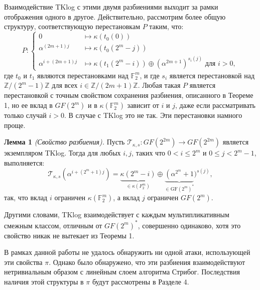 Взаимодействие TKlog с этими двумя разбиениями выходит за рамки отображения одного в другое. Действительно, рассмотрим более общую структуру, соответствующую перестановкам \( P \) таким, что:
\begin{equation}
  P :
  \begin{cases}
    0 & \mapsto \kappa (t_0(0)) \\
    \alpha^{(2m+1)j} & \mapsto \kappa (t_0(2^m - j)) \\
    \alpha^{i+(2m+1)j} & \mapsto \kappa (t_1(2^m - i)) \oplus (\alpha^{2m+1})^{s_i(j)} \text{ для } i > 0,
  \end{cases}
  \label{eq:02}
\end{equation}
где \( t_0 \) и \( t_1 \) являются перестановками над \( \mathbb{F}_{2}^{m} \), и где \( s_i \) является перестановкой над \( \mathbb{Z}/(2^m - 1)\mathbb{Z} \) для всех \( i \in \mathbb{Z}/(2m + 1)\mathbb{Z} \). Любая такая \( P \) является перестановкой с точным свойством сохранения разбиения, описанного в Теореме 1, но ее вклад в \( GF (2^m) \) и в \( \kappa(\mathbb{F}_{2}^{m}) \) зависит от \( i \) и \( j \), даже если рассматривать только случай \( i > 0 \). В случае с TKlog это не так. Эти перестановки намного проще.

\textbf{Лемма 1} \textit{(Свойство разбиения).} Пусть \( \mathscr{T}_{\kappa,s} : GF(2^{2m}) \to GF(2^{2m}) \) является экземпляром TKlog. Тогда для любых \( i, j \), таких что \( 0 < i \leq 2^m \) и \( 0 \leq j < 2^m - 1 \), выполняется:
\[
  \mathscr{T}_{\kappa, s}\left(\alpha^{i+\left(2^m+1\right) j}\right)=\underbrace{\kappa\left(2^m-i\right)}_{\in \kappa\left(F_2^m\right)} \oplus \underbrace{\left(\alpha^{2^m}+1\right.}_{\in \mathrm{GF}\left(2^m\right)^*})^{s(j)},
\]
так, что вклад \( i \) ограничен \( \kappa(\mathbb{F}_{2}^{m}) \), а вклад \( j \) ограничен \( GF(2^m) \).

Другими словами, TKlog взаимодействует с каждым мультипликативным смежным классом, отличным от \( GF(2^m)^{\ast} \), совершенно одинаково, хотя это свойство никак не вытекает из Теоремы 1.

В рамках данной работы не удалось обнаружить ни одной атаки, использующей эти свойства \( \pi \). Однако было обнаружено, что эти разбиения взаимодействуют нетривиальным образом с линейным слоем алгоритма Стрибог. Последствия наличия этой структуры в \( \pi \) будут рассмотрены в Разделе 4.